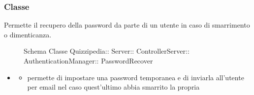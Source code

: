 \subsubsection{Classe }
Permette il recupero della password da parte di un utente in caso di smarrimento o dimenticanza.
\begin{figure}[H]
\centering
\noindent{}
\caption[Schema Classe PasswordRecover]{Schema Classe Quizzipedia:: Server:: ControllerServer:: AuthenticationManager:: PasswordRecover}
\end{figure}
\begin{itemize}
\item {}
\begin{itemize}
\item {}
\newline
permette di impostare una password temporanea e di inviarla all'utente per email nel caso quest'ultimo abbia smarrito la propria
\newline
\end{itemize}
\end{itemize}
